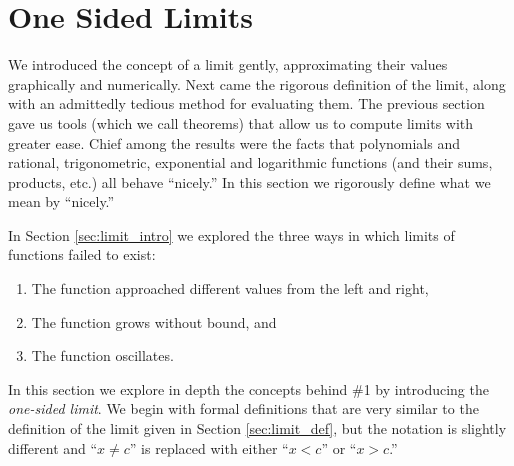 \section{One Sided Limits}\label{sec:limit_continuity}

%

We introduced the concept of a limit gently, approximating their values graphically and numerically. Next came the rigorous definition of the limit, along with an admittedly tedious method for evaluating them. The previous section gave us tools (which we call theorems) that allow us to compute limits with greater ease. Chief among the results were the facts that polynomials and rational, trigonometric, exponential and logarithmic functions (and their sums, products, etc.) all behave ``nicely.'' In this section we rigorously define what we mean by ``nicely.''

In Section \ref{sec:limit_intro} we explored the three ways in which limits of functions failed to exist: 
	\begin{enumerate}
	\item	The function approached different values from the left and right,
	\item	The function grows without bound, and 
	\item	The function oscillates.
	\end{enumerate}
	
In this section we explore in depth the concepts behind \#1 by introducing the \textit{one-sided limit}. We begin with formal definitions that are very similar to the definition of the limit given in Section \ref{sec:limit_def}, but the notation is slightly different and ``$x\neq c$'' is replaced with either ``$x<c$'' or ``$x>c$.''

